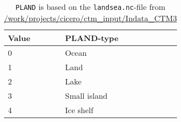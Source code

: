 \begin{table}[ht]
\centering
\begin{tabular}{|l|l|}
\hline
Value & PLAND-type   \\ \hline
0     & Ocean        \\ \hline
1     & Land         \\ \hline
2     & Lake         \\ \hline
3     & Small island \\ \hline
4     & Ice shelf    \\ \hline
\end{tabular}
\caption{\texttt{PLAND} is based on the \texttt{landsea.nc}-file from \protect\url{/work/projects/cicero/ctm_input/Indata_CTM3}}
\label{tab:PLAND}
\end{table}